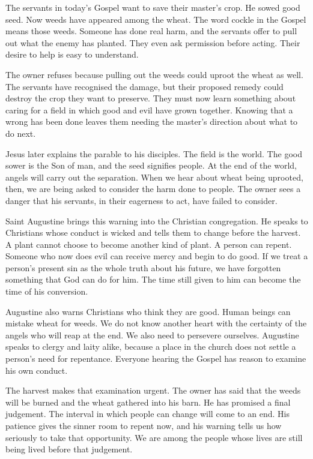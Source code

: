 The servants in today's Gospel want to save their master's crop. He sowed
good seed. Now weeds have appeared among the wheat. The word cockle in
the Gospel means those weeds. Someone has done real harm, and the servants
offer to pull out what the enemy has planted. They even ask permission
before acting. Their desire to help is easy to understand.

The owner refuses because pulling out the weeds could uproot the wheat
as well. The servants have recognised the
damage, but their proposed remedy could destroy the crop they want to
preserve. They must now learn something about caring for a field in which
good and evil have grown together. Knowing that a wrong has been done
leaves them needing the master's direction about what to do next.

Jesus later explains the parable to his disciples. The field is the world.
The good sower is the Son of man, and the seed signifies people. At the
end of the world, angels will carry out the separation. When we hear
about wheat being uprooted, then, we are being asked to consider the harm
done to people. The owner sees a danger that his servants, in their
eagerness to act, have failed to consider.

Saint Augustine brings this warning into the Christian congregation. He
speaks to Christians whose conduct is wicked and tells them to change
before the harvest. A plant cannot choose to become another kind of
plant. A person can repent. Someone who now does evil can receive mercy
and begin to do good. If we treat a person's present sin as the whole
truth about his future, we have forgotten something that God can do for
him. The time still given to him can become the time of his conversion.

Augustine also warns Christians who think they are good. Human beings
can mistake wheat for weeds. We do not know another heart with the
certainty of the angels who will reap at the end. We also need to
persevere ourselves. Augustine speaks to clergy and laity alike, because
a place in the church does not settle a person's need for repentance.
Everyone hearing the Gospel has reason to examine his own conduct.

The harvest makes that examination urgent. The owner has said that the
weeds will be burned and the wheat gathered into his barn. He has
promised a final judgement. The interval in which people can change will
come to an end. His patience gives the sinner room to repent now, and
his warning tells us how seriously to take that opportunity. We are
among the people whose lives are still being lived before that judgement.

